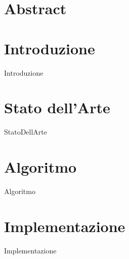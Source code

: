 \documentclass[12pt,oneside]{report}
\begin{document}
 
	                
	\begin{titlepage}
		
	\end{titlepage} 
    
    
	\chapter*{Abstract}
	
    \tableofcontents{}
    \listoftables
    \listoflistings
    \newpage
    \chapter{Introduzione}
    {Introduzione}
    \chapter{Stato dell'Arte}
    {StatoDellArte}
    \chapter{Algoritmo}
    {Algoritmo}
    \chapter{Implementazione}
    {Implementazione}
    
 
     
    
\end{document}
